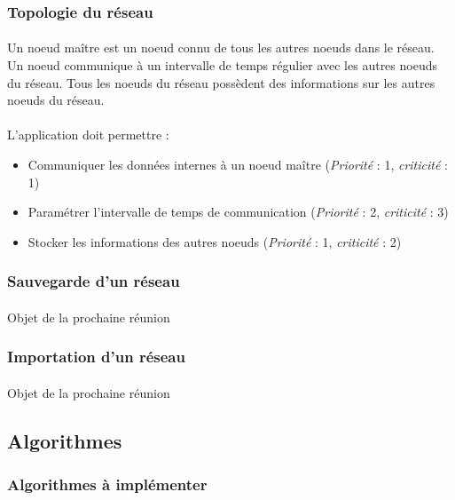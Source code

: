 \documentclass[12pt]{article}
\newcommand{\besoin}[2] {
  (\textit{Priorité} : #1, \textit{criticité} : #2)
}
\begin{document}
\subsubsection{Topologie du réseau}

\paragraph{} Un noeud maître est un noeud connu de tous les autres noeuds dans le réseau. Un noeud communique à un intervalle de temps régulier avec les autres noeuds du réseau. Tous les noeuds du réseau possèdent des informations sur les autres noeuds du réseau.

\paragraph{} L'application doit permettre :
\begin{itemize}
	\item Communiquer les données internes à un noeud maître \besoin{1}{1}
	\item Paramétrer l'intervalle de temps de communication \besoin{2}{3}
	\item Stocker les informations des autres noeuds \besoin{1}{2}
\end{itemize}

\subsubsection{Sauvegarde d'un réseau}
\paragraph{}  Objet de la prochaine réunion

\subsubsection{Importation d'un réseau}
\paragraph{} Objet de la prochaine réunion


\subsection{Algorithmes}

\subsubsection{Algorithmes à implémenter}
\end{document}
